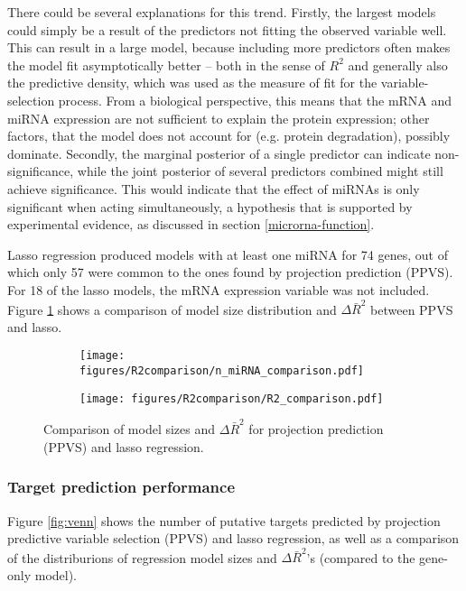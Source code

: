 There could be several explanations for this trend. Firstly, the largest
models could simply be a result of the predictors not fitting the observed
variable well. This can result in a large model, because including more
predictors often makes the model fit asymptotically better -- both in the
sense of $R^2$ and generally also the predictive density, which was used as
the measure of fit for the variable-selection process. From a biological
perspective, this means that the mRNA and miRNA expression are not sufficient
to explain the protein expression; other factors, that the model does not
account for (e.g. protein degradation), possibly dominate.
Secondly, the marginal posterior of a single predictor can indicate
non-significance, while the joint posterior of several predictors combined
might still achieve significance. This would indicate that the effect of
miRNAs is only significant when acting simultaneously, a hypothesis that is
supported by experimental evidence, as discussed in section
\ref{microrna-function}.

Lasso regression produced models with at least one miRNA for 74 genes, out of
which only 57 were common to the ones found by projection prediction (PPVS).
For 18 of the lasso models, the mRNA expression variable was not included.
Figure \ref{fig:model-size} shows a comparison of model size distribution
and $\Delta\bar{R}^2$ between PPVS and lasso.

\begin{figure}[!h]
  \centering
  \begin{subfigure}{.45\textwidth}
    \centering
    \texttt{[image: figures/R2comparison/n\_miRNA\_comparison.pdf]}
  \end{subfigure}
  \begin{subfigure}{.45\textwidth}
    \centering
    \texttt{[image: figures/R2comparison/R2\_comparison.pdf]}
  \end{subfigure}

  \caption{Comparison of model sizes and $\Delta\bar{R}^2$ for
      projection prediction (PPVS) and lasso regression.}
  \label{fig:model-size}
\end{figure}




\subsubsection{Target prediction performance}

Figure \ref{fig:venn} shows the number of putative targets
predicted by projection predictive variable
selection (PPVS) and lasso regression, as well as a comparison
of the distriburions of regression model sizes and $\Delta\bar{R}^2$'s
(compared to the gene-only model).

